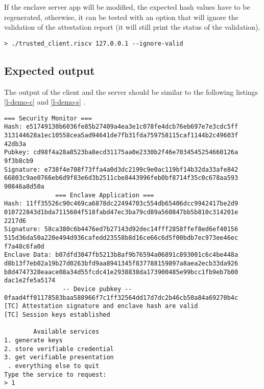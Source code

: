 If the enclave server app will be modified, the expected hash values have to be regenerated, otherwise, it can be tested with an option that will ignore the validation of the attestation report (it will still print the status of the validation). 

\begin{lstlisting}[frame=single]
  > ./trusted_client.riscv 127.0.0.1 --ignore-valid        
\end{lstlisting}

\subsection{Expected output}
The output of the client and the server should be similar to the following listings \ref{l-demo-c} and \ref{l-demo-s} . 
\begin{lstlisting}[caption={Example of output at client side},captionpos=b,style=DOS,label={l-demo-c},frame=single]
              === Security Monitor ===
Hash: e51749130b6036fe85b27409a4ea3e1c078fe4dcb76eb697e7e3cdc5ff
313144628a1ec10558cea5ad94641de7fb31fda759758115caf1144b2c49603f
42db3a
Pubkey: cd98f4a28a8523ba8ecd31175aa0e2330b2f46e7034545254660126a
9f3b8cb9
Signature: e738f4e708f73ffa4a0d3dc2199c9e0ac119bf14b32da33afe842
66803c9ae0766eb6d9f83e6d3b2511cbe8443996feb0bf8714f35c0c678aa593
90846a8d50a
              === Enclave Application ===
Hash: 11ff35526c90c469ca6878dc22494703c554db65406dcc9942417be2d9
010722843d1bda7115604f518fabd47ec3ba79cd89a560847bb5b810c314201e
2217d6
Signature: 58ca380c6b4476ed7b27143d92dec14fff2858ffef8ed6ef40156
515d36da50a220e494d936cafedd23558b8d16ce66c6d5f00bdb7ec973ee46ec
f7a48c6fa0d
Enclave Data: b07dfd3047fb5213b8af9b76594a06891c893001c6c4be448a
d8b13f7eb02a19b27d0263bfd9aa8941345f837788159897a8aea2ecb33da926
b8d4747328eaace08a34d55fcdc41e2938838da173900485e99bcc1fb9eb7b00
dac1e2fe5a5174
                -- Device pubkey --
0faad4ff01178583baa588966f7c1ff32564dd17d7dc2b46cb50a84a69270b4c
[TC] Attestation signature and enclave hash are valid
[TC] Session keys established

        Available services
1. generate keys
2. store verifiable credential
3. get verifiable presentation
 . everything else to quit 
Type the service to request:
> 1
\end{lstlisting}
\leavevmode\newline


